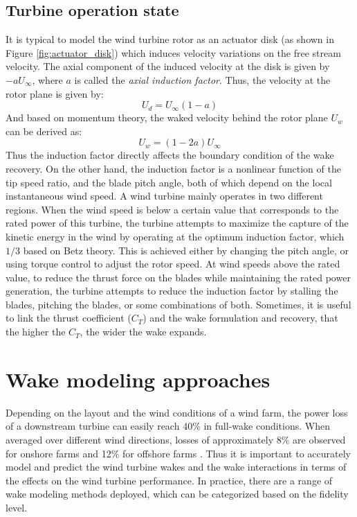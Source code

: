 \documentclass{umthesis}
\begin{document}
\subsection{Turbine operation state}
It is typical to model the wind turbine rotor as an actuator disk (as shown in Figure \ref{fig:actuator_disk}) which induces velocity variations on the free stream velocity. The axial component of the induced velocity at the disk is given by $-aU_\infty$, where $a$ is called the \textit{axial induction factor}. Thus, the velocity at the rotor plane is given by:
\begin{equation}
 U_d=U_\infty(1-a)
\end{equation}
And based on momentum theory, the waked velocity behind the rotor plane $U_w$ can be derived as:
\begin{equation}
 U_w=(1-2a)U_\infty
\end{equation}
Thus the induction factor directly affects the boundary condition of the wake recovery. On the other hand, the induction factor is a nonlinear function of the tip speed ratio, and the blade pitch angle, both of which depend on the local instantaneous wind speed. A wind turbine mainly operates in two different regions. When the wind speed is below a certain value that corresponds to the rated power of this turbine, the turbine attempts to maximize the capture of the kinetic energy in the wind by operating at the optimum induction factor, which $1/3$ based on Betz theory. This is achieved either by changing the pitch angle, or using torque control to adjust the rotor speed. At wind speeds above the rated value, to reduce the thrust force on the blades while maintaining the rated power generation, the turbine attempts to reduce the induction factor by stalling the blades, pitching the blades, or some combinations of both. Sometimes, it is useful to link the thrust coefficient ($C_T$) and the wake formulation and recovery, that the higher the $C_T$, the wider the wake expands.



\section{Wake modeling approaches}
Depending on the layout and the wind conditions of a wind farm, the power loss of a downstream turbine can easily reach 40\% in full-wake conditions. When averaged over different wind directions, losses of approximately 8\% are observed for onshore farms and 12\% for offshore farms \cite{Barthelmie_2008}. Thus it is important to accurately model and predict the wind turbine wakes and the wake interactions in terms of the effects on the wind turbine performance. In practice, there are a range of wake modeling methods deployed, which can be categorized based on the fidelity level.
\end{document}
